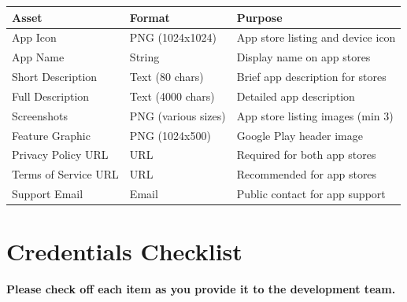 \documentclass[11pt,a4paper]{article}
\begin{document}
\begin{tabularx}{\textwidth}{|p{4cm}|p{3cm}|Y|}
\hline
{}
\textbf{Asset} & \textbf{Format} & \textbf{Purpose} \\
\hline
App Icon & PNG (1024x1024) & App store listing and device icon \\
\hline
App Name & String & Display name on app stores \\
\hline
Short Description & Text (80 chars) & Brief app description for stores \\
\hline
Full Description & Text (4000 chars) & Detailed app description \\
\hline
Screenshots & PNG (various sizes) & App store listing images (min 3) \\
\hline
Feature Graphic & PNG (1024x500) & Google Play header image \\
\hline
Privacy Policy URL & URL & Required for both app stores \\
\hline
Terms of Service URL & URL & Recommended for app stores \\
\hline
Support Email & Email & Public contact for app support \\
\hline
\end{tabularx}


\newpage
\section{Credentials Checklist}

\begin{center}
\textbf{Please check off each item as you provide it to the development team.}
\end{center}

\vspace{0.5cm}
\end{document}
